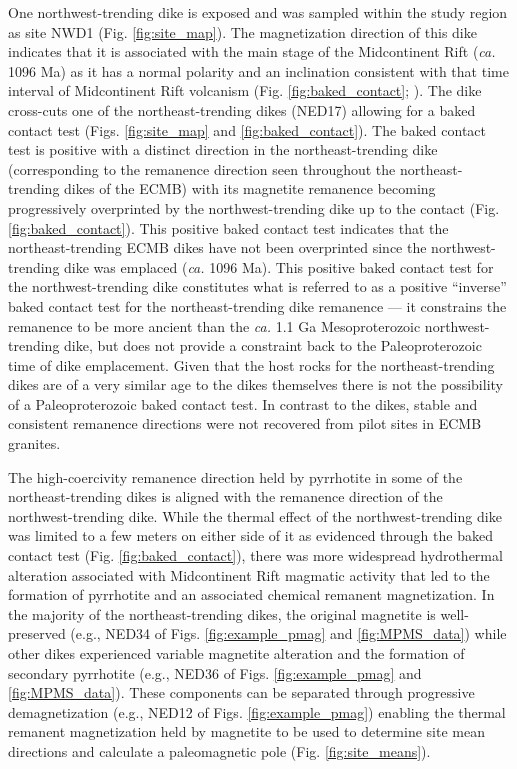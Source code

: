 \documentclass[draft]{agujournal2019}
\begin{document}
One northwest-trending dike is exposed and was sampled within the study region as site NWD1 (Fig. \ref{fig:site_map}). The magnetization direction of this dike indicates that it is associated with the main stage of the Midcontinent Rift (\textit{ca.} 1096 Ma) as it has a normal polarity and an inclination consistent with that time interval of Midcontinent Rift volcanism (Fig. \ref{fig:baked_contact}; ). The dike cross-cuts one of the northeast-trending dikes (NED17) allowing for a baked contact test (Figs. \ref{fig:site_map} and \ref{fig:baked_contact}). The baked contact test is positive with a distinct direction in the northeast-trending dike (corresponding to the remanence direction seen throughout the northeast-trending dikes of the ECMB) with its magnetite remanence becoming progressively overprinted by the northwest-trending dike up to the contact (Fig. \ref{fig:baked_contact}). This positive baked contact test indicates that the northeast-trending ECMB dikes have not been overprinted since the northwest-trending dike was emplaced (\textit{ca.} 1096 Ma). This positive baked contact test for the northwest-trending dike constitutes what is referred to as a positive ``inverse'' baked contact test for the northeast-trending dike remanence --- it constrains the remanence to be more ancient than the \textit{ca.} 1.1 Ga Mesoproterozoic northwest-trending dike, but does not provide a constraint back to the Paleoproterozoic time of dike emplacement. Given that the host rocks for the northeast-trending dikes are of a very similar age to the dikes themselves there is not the possibility of a Paleoproterozoic baked contact test. In contrast to the dikes, stable and consistent remanence directions were not recovered from pilot sites in ECMB granites. 

The high-coercivity remanence direction held by pyrrhotite in some of the northeast-trending dikes is aligned with the remanence direction of the northwest-trending dike. While the thermal effect of the northwest-trending dike was limited to a few meters on either side of it as evidenced through the baked contact test (Fig. \ref{fig:baked_contact}), there was more widespread hydrothermal alteration associated with Midcontinent Rift magmatic activity that led to the formation of pyrrhotite and an associated chemical remanent magnetization. In the majority of the northeast-trending dikes, the original magnetite is well-preserved (e.g., NED34 of Figs. \ref{fig:example_pmag} and \ref{fig:MPMS_data}) while other dikes experienced variable magnetite alteration and the formation of secondary pyrrhotite (e.g., NED36 of Figs. \ref{fig:example_pmag} and \ref{fig:MPMS_data}). These components can be separated through progressive demagnetization (e.g., NED12 of Figs. \ref{fig:example_pmag}) enabling the thermal remanent magnetization held by magnetite to be used to determine site mean directions and calculate a paleomagnetic pole (Fig. \ref{fig:site_means}).
\end{document}
